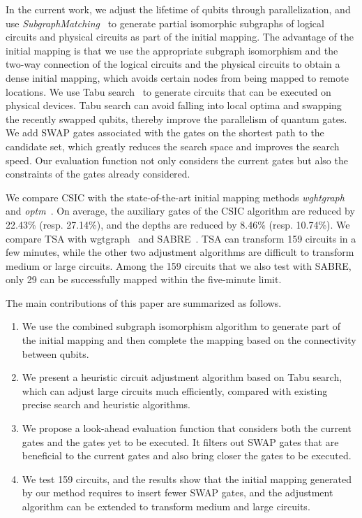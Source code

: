 \documentclass[journal]{IEEEtran}
\begin{document}
	In the current work, we adjust the lifetime of qubits through parallelization, and use \emph{SubgraphMatching}~\cite{Sun2020} to generate partial isomorphic subgraphs of logical circuits %
	and physical circuits %
	as part of the initial mapping. The advantage of the initial mapping is that we use the appropriate subgraph isomorphism and the two-way connection of the logical circuits and the physical circuits to obtain a dense initial mapping, which avoids certain nodes from being mapped to remote locations. We use Tabu search~\cite{Glover1990} to generate circuits that can be executed on physical devices. Tabu search can avoid falling into local optima and swapping the recently swapped qubits, thereby improve the parallelism of quantum gates. We add SWAP gates associated with the gates on the shortest path to the candidate set, which greatly reduces the search space and improves the search speed. Our evaluation function not only considers the current gates but also the constraints of the gates already considered.
	
	We compare CSIC with the state-of-the-art initial mapping methods \emph{wghtgraph}~\cite{2020Qubit} and \emph{optm}~\cite{Zulehner2017}. On average, the auxiliary gates of the CSIC algorithm are reduced by 22.43\% (resp. 27.14\%), and the depths are reduced by 8.46\% (resp. 10.74\%). We compare TSA with wgtgraph~\cite{2020Qubit} and SABRE~\cite{Li2018}. TSA can transform 159 circuits in a few minutes, while the  other two adjustment algorithms are difficult to transform medium or large circuits.  Among the 159 circuits that we also test with SABRE, only 29  can be successfully mapped within the five-minute limit.
	
	The main contributions of this paper are summarized as follows.
	\begin{enumerate}
		\item We use the combined subgraph isomorphism algorithm to generate part of the initial mapping
		and then complete the mapping based on the connectivity between qubits.  
		\item We present a heuristic circuit adjustment algorithm based on Tabu search, which can adjust large circuits much efficiently, compared with existing precise search and heuristic algorithms.
		\item  We propose a look-ahead evaluation function that considers both the current gates and the  gates yet to be executed. It filters out SWAP gates that are beneficial to the current gates and also bring closer the gates to be executed.
		\item We test 159 circuits, and the results show that the initial mapping generated by our method requires to insert fewer SWAP gates, and the adjustment algorithm can be extended to transform medium and large circuits.
	\end{enumerate}
	
\end{document}
